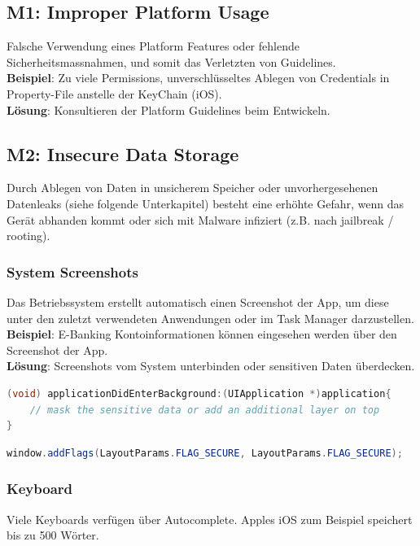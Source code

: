 \subsection{M1: Improper Platform Usage}
Falsche Verwendung eines Platform Features oder fehlende Sicherheitsmassnahmen, und somit das Verletzten von Guidelines. \\

\textbf{Beispiel}: Zu viele Permissions, unverschlüsseltes Ablegen von Credentials in Property-File anstelle der KeyChain (iOS). \\

\textbf{Lösung}: Konsultieren der Platform Guidelines beim Entwickeln.

\subsection{M2: Insecure Data Storage}
Durch Ablegen von Daten in unsicherem Speicher oder unvorhergesehenen Datenleaks (siehe folgende Unterkapitel) besteht eine erhöhte Gefahr, wenn das Gerät abhanden kommt oder sich mit Malware infiziert (z.B. nach jailbreak / rooting).

\subsubsection{System Screenshots}
Das Betriebssystem erstellt automatisch einen Screenshot der App, um diese unter den zuletzt verwendeten Anwendungen oder im Task Manager darzustellen.\\

\textbf{Beispiel}: E-Banking Kontoinformationen können eingesehen werden über den Screenshot der App.\\

\textbf{Lösung}: Screenshots vom System unterbinden oder sensitiven Daten überdecken.
\begin{lstlisting}[language=C, caption=Lösung für iOS]
(void) applicationDidEnterBackground:(UIApplication *)application{
	// mask the sensitive data or add an additional layer on top			
}
\end{lstlisting}
\begin{lstlisting}[language=Java, caption=Lösung für Android]
window.addFlags(LayoutParams.FLAG_SECURE, LayoutParams.FLAG_SECURE);
\end{lstlisting}

\subsubsection{Keyboard}
Viele Keyboards verfügen über Autocomplete. Apples iOS zum Beispiel speichert bis zu 500 Wörter.\\

